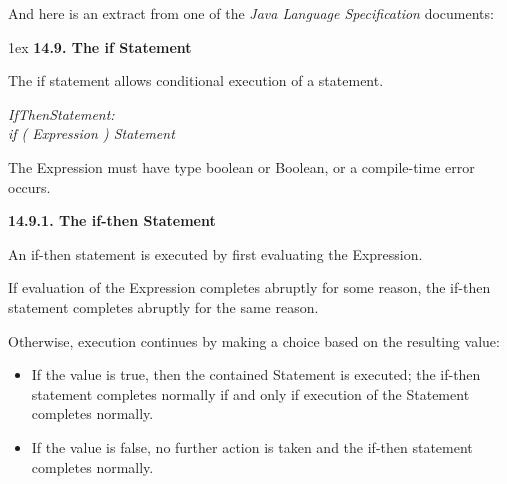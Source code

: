 \documentclass[11pt]{book}
\begin{document}
\noindent And here is an extract from one of the {\em Java Language Specification} documents:\\[2ex]
\begin{boxedminipage}{\textwidth}
\sf\parindent0pt\parskip1ex
{\bfseries 14.9. The if Statement}

The if statement allows conditional execution of a statement.

{\em IfThenStatement:\\\hspace*{2em}
    if ( Expression ) Statement
}

\noindent The Expression must have type boolean or Boolean, or a compile-time error occurs.

{\bfseries 14.9.1. The if-then Statement}

An if-then statement is executed by first evaluating the Expression.

If evaluation of the Expression completes abruptly for some reason, the if-then statement completes abruptly for the same reason.

Otherwise, execution continues by making a choice based on the resulting value:
\begin{itemize}
\item If the value is true, then the contained Statement is executed; the if-then statement completes normally if and only if execution of the Statement completes normally.

\item If the value is false, no further action is taken and the if-then statement completes normally.
\end{itemize}
\end{boxedminipage}
\end{document}
